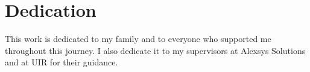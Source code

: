 \chapter*{Dedication}
This work is dedicated to my family and to everyone who supported me throughout this journey. I also dedicate it to my supervisors at Alexsys Solutions and at UIR for their guidance.
